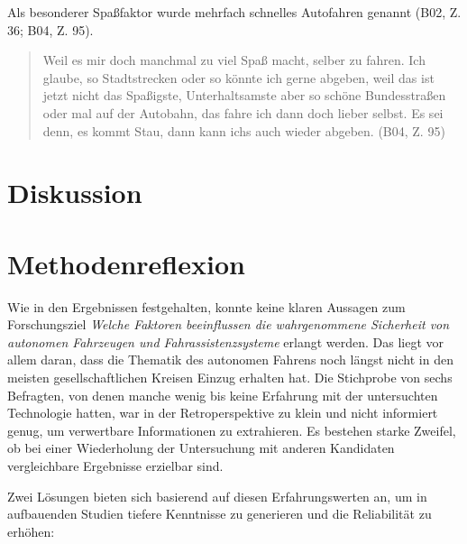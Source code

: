 \documentclass[12pt]{article}
\begin{document}
Als besonderer Spaßfaktor wurde mehrfach schnelles Autofahren genannt (B02, Z. 36; B04, Z. 95).

\begin{quote}
  Weil es mir doch manchmal zu viel Spaß macht, selber zu fahren. Ich glaube, so Stadtstrecken oder so könnte ich gerne abgeben, weil das ist jetzt nicht das Spaßigste, Unterhaltsamste aber so schöne Bundesstraßen oder mal auf der Autobahn, das fahre ich dann doch lieber selbst. Es sei denn, es kommt Stau, dann kann ichs auch wieder abgeben. (B04, Z. 95)
\end{quote}


\clearpage
\section{Diskussion}

\clearpage
\section{Methodenreflexion}

Wie in den Ergebnissen festgehalten, konnte keine klaren Aussagen zum Forschungsziel \emph{Welche Faktoren beeinflussen die wahrgenommene Sicherheit von autonomen Fahrzeugen und Fahrassistenzsysteme} erlangt werden.  Das liegt vor allem daran, dass die Thematik des autonomen Fahrens noch längst nicht in den meisten gesellschaftlichen Kreisen Einzug erhalten hat. Die Stichprobe von sechs Befragten, von denen manche wenig bis keine Erfahrung mit der untersuchten Technologie hatten, war in der Retroperspektive zu klein und nicht informiert genug, um verwertbare Informationen zu extrahieren. Es bestehen starke Zweifel, ob bei einer Wiederholung der Untersuchung mit anderen Kandidaten vergleichbare Ergebnisse erzielbar sind.

Zwei Lösungen bieten sich basierend auf diesen Erfahrungswerten an, um in aufbauenden Studien tiefere Kenntnisse zu generieren und die Reliabilität zu erhöhen:
\end{document}
